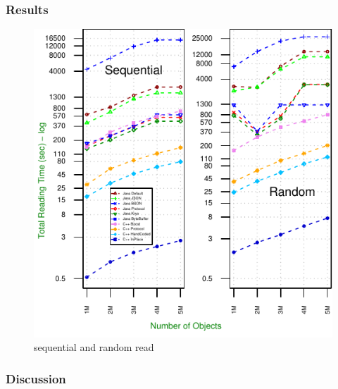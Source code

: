 \subsubsection{Results}
\begin{figure}
	\centering
	\includegraphics[scale=1]{img/Experiment_ReadObjects_CPU.pdf}
	\caption{sequential and random read}
	\label{fig:sequental_random_read}
\end{figure}

\subsubsection{Discussion}

